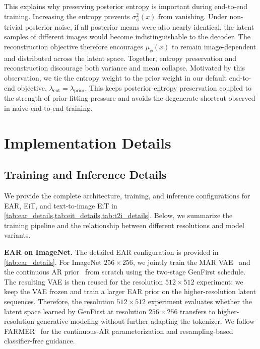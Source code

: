 This explains why preserving posterior entropy is important during end-to-end
training. Increasing the entropy prevents $\sigma_\phi^2(x)$ from vanishing.
Under non-trivial posterior noise, if all posterior means were also nearly
identical, the latent samples of different images would become indistinguishable
to the decoder. The reconstruction objective therefore encourages
$\mu_\phi(x)$ to remain image-dependent and distributed across the latent space.
Together, entropy preservation and reconstruction discourage both variance and
mean collapse.
Motivated by this observation, we tie the entropy weight to the prior weight in
our default end-to-end objective,
$\lambda_{\mathrm{ent}}=\lambda_{\mathrm{prior}}$.
This keeps posterior-entropy preservation coupled to the strength of prior-fitting pressure and avoids the degenerate shortcut observed in naive end-to-end training.

\section{Implementation Details}
\label{app:implementation_details}

\subsection{Training and Inference Details}
\label{app:training_details}
We provide the complete architecture, training, and inference configurations for
EAR, EiT, and text-to-image EiT in
\cref{tab:ear_details,tab:eit_details,tab:t2i_details}.
Below, we summarize the training pipeline and the relationship between different
resolutions and model variants.

\textbf{EAR on ImageNet.}
The detailed EAR configuration is provided in \cref{tab:ear_details}.
For ImageNet $256\times256$, we jointly train the MAR VAE~\cite{mar} and the continuous AR prior~\cite{zheng2025farmer} from scratch using the two-stage GenFirst schedule.
The resulting VAE is then reused for the resolution $512\times512$ experiment: we keep the
VAE frozen and train a larger EAR prior on the higher-resolution latent
sequences.
Therefore, the resolution $512\times512$ experiment evaluates whether the latent space
learned by GenFirst at resolution $256\times256$ transfers to higher-resolution generative
modeling without further adapting the tokenizer.
We follow FARMER~\cite{zheng2025farmer} for the continuous-AR parameterization
and resampling-based classifier-free guidance.

